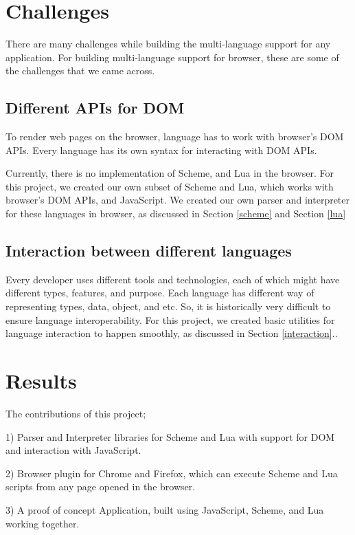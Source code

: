 \section{Challenges}

There are many challenges while building the multi-language support for any application. For building multi-language support for browser, these are some of the challenges that we came across.

\subsection{Different APIs for DOM}

To render web pages on the browser, language has to work with browser's DOM APIs. Every language has its own syntax for interacting with DOM APIs. 

Currently, there is no implementation of Scheme, and Lua in the browser. For this project, we created our own subset of Scheme and Lua, which works with browser's DOM APIs, and JavaScript.  We created our own parser and interpreter for these languages in browser, as discussed in Section \ref{scheme} and Section \ref{lua}

\subsection{Interaction between different languages}

Every developer uses different tools and technologies, each of which might have different types, features, and purpose. Each language has different way of representing types, data, object, and etc. So, it is historically very difficult to ensure language interoperability. For this project, we created basic utilities for language interaction to happen smoothly, as discussed in Section \ref{interaction}..

\section{Results}

The contributions of this project;

1) Parser and Interpreter libraries for Scheme and Lua with support for DOM and interaction with JavaScript.

2) Browser plugin for Chrome and Firefox, which can execute Scheme and Lua scripts from any page opened in the browser.

3) A proof of concept Application, built using JavaScript, Scheme, and Lua working together.
